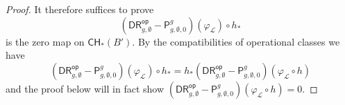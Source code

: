 \documentclass[a4paper,12pt]{article} %
\newcommand{\ca}[1]{{\mathcal{#1}}}
\def\P{\mathsf{P}}
\theoremstyle{definition}
\theoremstyle{plain}%
\renewcommand{\phi}{\varphi}
\newcommand{\Chow}{\mathsf{CH}}
\newcommand{\invnrIV}{VI}
\newcommand{\jocomment}[1]{}
\newcommand{\DRop}{\mathsf{DR}^{\mathsf{op}}}
\begin{document}
\begin{proof}


It therefore suffices to prove  
\begin{equation}
\left( \DRop_{g,\emptyset}-\P_{g,\emptyset,0}^g \right) (\phi_\ca L) \circ h_*
\end{equation}
is the zero map on $\Chow_*(B')$. By the compatibilities of operational classes we have
\begin{equation*}
\left( \DRop_{g,\emptyset}-\P_{g,\emptyset,0}^g \right) (\phi_\ca L) \circ h_* = h_* \left( \DRop_{g,\emptyset}-\P_{g,\emptyset,0}^g \right) (\phi_\ca L \circ h)
\end{equation*}
and the proof below will in fact show $\left( \DRop_{g,\emptyset}-\P_{g,\emptyset,0}^g \right) (\phi_\ca L \circ h)=0$. 




\end{proof}
\end{document}

